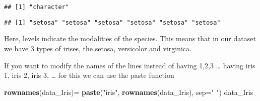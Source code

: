 \documentclass[
]{article}
\newenvironment{Shaded}{\begin{snugshade}}{\end{snugshade}}
\newcommand{\AttributeTok}[1]{\textcolor[rgb]{0.13,0.29,0.53}{#1}}
\newcommand{\FunctionTok}[1]{\textcolor[rgb]{0.13,0.29,0.53}{\textbf{#1}}}
\newcommand{\NormalTok}[1]{#1}
\newcommand{\OtherTok}[1]{\textcolor[rgb]{0.56,0.35,0.01}{#1}}
\newcommand{\SpecialCharTok}[1]{\textcolor[rgb]{0.81,0.36,0.00}{\textbf{#1}}}
\newcommand{\StringTok}[1]{\textcolor[rgb]{0.31,0.60,0.02}{#1}}
\begin{document}
\begin{Shaded}
\end{Shaded}

\begin{verbatim}
## [1] "character"
\end{verbatim}

\begin{Shaded}
\end{Shaded}

\begin{verbatim}
## [1] "setosa" "setosa" "setosa" "setosa" "setosa" "setosa"
\end{verbatim}

Here, levels indicate the modalities of the species. This means that in
our dataset we have 3 types of irises, the setosa, versicolor and
virginica.

If you want to modify the names of the lines instead of having 1,2,3
\ldots{} having iris 1, iris 2, iris 3, \ldots{} for this we can use the
paste function

\begin{Shaded}
\begin{Highlighting}[]
\FunctionTok{rownames}\NormalTok{(data\_Iris)}\OtherTok{=} \FunctionTok{paste}\NormalTok{(}\StringTok{"iris"}\NormalTok{, }\FunctionTok{rownames}\NormalTok{(data\_Iris), }\AttributeTok{sep=}\StringTok{" "}\NormalTok{)}
\NormalTok{data\_Iris}
\end{Highlighting}
\end{Shaded}
\end{document}
